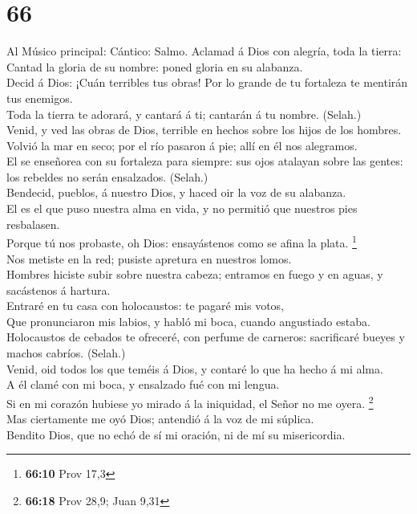 \hypertarget{section-65}{%
\section{66}\label{section-65}}

 Al Músico principal: Cántico: Salmo. Aclamad á Dios con
alegría, toda la tierra:\\
 Cantad la gloria de su nombre: poned gloria en su
alabanza.\\
 Decid á Dios: ¡Cuán terribles tus obras! Por lo grande de
tu fortaleza te mentirán tus enemigos.\\
 Toda la tierra te adorará, y cantará á ti; cantarán á tu
nombre. (Selah.)\\
 Venid, y ved las obras de Dios, terrible en hechos sobre
los hijos de los hombres.\\
 Volvió la mar en seco; por el río pasaron á pie; allí en él
nos alegramos.\\
 El se enseñorea con su fortaleza para siempre: sus ojos
atalayan sobre las gentes: los rebeldes no serán ensalzados. (Selah.)\\
 Bendecid, pueblos, á nuestro Dios, y haced oir la voz de su
alabanza.\\
 El es el que puso nuestra alma en vida, y no permitió que
nuestros pies resbalasen.\\
 Porque tú nos probaste, oh Dios: ensayástenos como se
afina la plata. \footnote{\textbf{66:10} Prov 17,3}\\
 Nos metiste en la red; pusiste apretura en nuestros
lomos.\\
 Hombres hiciste subir sobre nuestra cabeza; entramos en
fuego y en aguas, y sacástenos á hartura.\\
 Entraré en tu casa con holocaustos: te pagaré mis votos,\\
 Que pronunciaron mis labios, y habló mi boca, cuando
angustiado estaba.\\
 Holocaustos de cebados te ofreceré, con perfume de
carneros: sacrificaré bueyes y machos cabríos. (Selah.)\\
 Venid, oid todos los que teméis á Dios, y contaré lo que
ha hecho á mi alma.\\
 A él clamé con mi boca, y ensalzado fué con mi lengua.\\
 Si en mi corazón hubiese yo mirado á la iniquidad, el
Señor no me oyera. \footnote{\textbf{66:18} Prov 28,9; Juan 9,31}\\
 Mas ciertamente me oyó Dios; antendió á la voz de mi
súplica.\\
 Bendito Dios, que no echó de sí mi oración, ni de mí su
misericordia.

